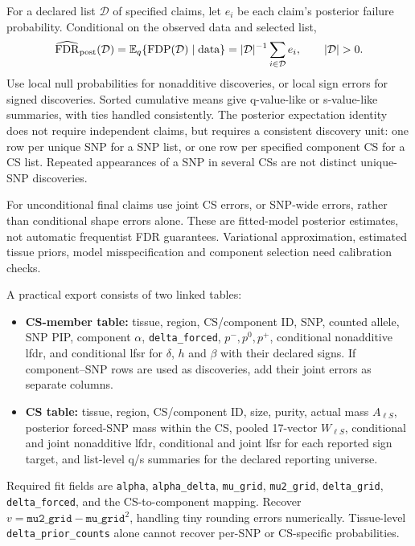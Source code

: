 \documentclass[11pt]{article}
\newcommand{\E}{\mathbb E}
\begin{document}
For a declared list $\mathcal D$ of specified claims, let $e_i$ be each
claim's posterior failure probability. Conditional on the observed data
and selected list,
\begin{equation}
 \widehat{\operatorname{FDR}}_{\rm post}(\mathcal D)
 =\E_q\{\operatorname{FDP}(\mathcal D)\mid\text{data}\}
 =|\mathcal D|^{-1}\sum_{i\in\mathcal D}e_i,\qquad |\mathcal D|>0.
 \label{eq:posterior-fdr}
\end{equation}
Use local null probabilities for nonadditive discoveries, or local sign
errors for signed discoveries. Sorted cumulative means give q-value-like
or s-value-like summaries, with ties handled consistently. The posterior
expectation identity does not require independent claims, but requires
a consistent discovery unit: one row per unique SNP for a SNP list, or
one row per specified component CS for a CS list. Repeated appearances
of a SNP in several CSs are not distinct unique-SNP discoveries.

For unconditional final claims use joint CS errors, or SNP-wide errors,
rather than conditional shape errors alone. These are fitted-model
posterior estimates, not automatic frequentist FDR guarantees.
Variational approximation, estimated tissue priors, model misspecification
and component selection need calibration checks.

A practical export consists of two linked tables:
\begin{itemize}
 \item \textbf{CS-member table:} tissue, region, CS/component ID, SNP,
 counted allele, SNP PIP, component $\alpha$, \texttt{delta\_forced},
 $p^-,p^0,p^+$, conditional nonadditive lfdr, and conditional lfsr for
 $\delta$, $h$ and $\beta$ with their declared signs. If component--SNP
 rows are used as discoveries, add their joint errors as separate columns.
 \item \textbf{CS table:} tissue, region, CS/component ID, size, purity,
 actual mass $A_{\ell S}$, posterior forced-SNP mass within the CS,
 pooled 17-vector $W_{\ell S}$, conditional and joint nonadditive lfdr,
 conditional and joint lfsr for each reported sign target, and list-level
 q/s summaries for the declared reporting universe.
\end{itemize}
Required fit fields are \texttt{alpha}, \texttt{alpha\_delta},
\texttt{mu\_grid}, \texttt{mu2\_grid}, \texttt{delta\_grid},
\texttt{delta\_forced}, and the CS-to-component mapping.
Recover $v=\texttt{mu2\_grid}-\texttt{mu\_grid}^2$, handling tiny rounding
errors numerically. Tissue-level \texttt{delta\_prior\_counts} alone cannot
recover per-SNP or CS-specific probabilities.
\end{document}
